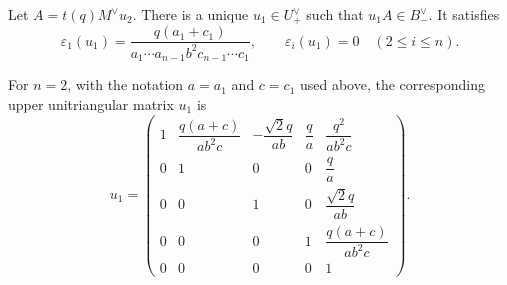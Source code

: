 \begin{lemma}\label{lem:triangular-elimination}
Let \(A=t(q)M^\vee u_2\). There is a unique \(u_1\in U_+^\vee\) such that \(u_1A\in B_-^\vee\). It satisfies
\[
\varepsilon_1(u_1)
=
\frac{q(a_1+c_1)}{a_1\cdots a_{n-1}b^2c_{n-1}\cdots c_1},
\qquad
\varepsilon_i(u_1)=0\quad(2\le i\le n).
\]
\end{lemma}

For \(n=2\), with the notation \(a=a_1\) and \(c=c_1\) used above, the corresponding upper unitriangular matrix \(u_1\) is
\[
u_1=
\begin{pmatrix}
1&\dfrac{q(a+c)}{ab^2c}&-\dfrac{\sqrt2q}{ab}&\dfrac{q}{a}&\dfrac{q^2}{ab^2c}\\[1.1em]
0&1&0&0&\dfrac{q}{a}\\[1.1em]
0&0&1&0&\dfrac{\sqrt2q}{ab}\\[1.1em]
0&0&0&1&\dfrac{q(a+c)}{ab^2c}\\[1.1em]
0&0&0&0&1
\end{pmatrix}.
\]

